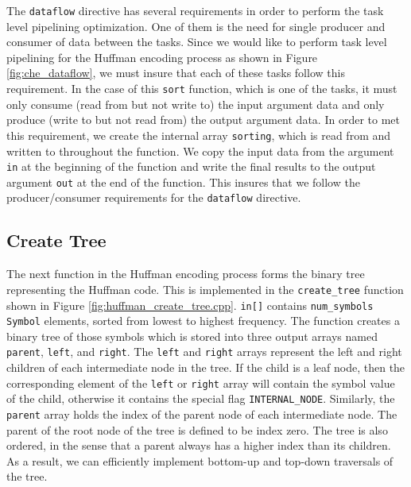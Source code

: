 \begin{aside}
The \lstinline{dataflow} directive has several requirements in order to perform the task level pipelining optimization. One of them is the need for single producer and consumer of data between the tasks. Since we would like to perform task level pipelining for the Huffman encoding process as shown in Figure \ref{fig:che_dataflow}, we must insure that each of these tasks follow this requirement. In the case of this \lstinline{sort} function, which is one of the tasks, it must only consume (read from but not write to) the input argument data and only produce (write to but not read from) the output argument data. In order to met this requirement, we create the internal array \lstinline{sorting}, which is read from and written to throughout the function. We copy the input data from the argument \lstinline{in} at the beginning of the function and write the final results to the output argument \lstinline{out} at the end of the function. This insures that we follow the producer/consumer requirements for the \lstinline{dataflow} directive.
\end{aside}

\subsection{Create Tree}
The next function in the Huffman encoding process forms the binary tree representing the Huffman code. This is implemented in the \lstinline{create_tree} function shown in Figure \ref{fig:huffman_create_tree.cpp}. \lstinline{in[]} contains \lstinline{num_symbols} \lstinline{Symbol} elements, sorted from lowest to highest frequency. The function creates a binary tree of those symbols which is stored into three output arrays named \lstinline{parent}, \lstinline{left}, and \lstinline{right}.  The \lstinline{left} and \lstinline{right} arrays represent the left and right children of each intermediate node in the tree.  If the child is a leaf node, then the corresponding element of the \lstinline{left} or \lstinline{right} array will contain the symbol value of the child, otherwise it contains the special flag \lstinline{INTERNAL_NODE}.   Similarly, the \lstinline{parent} array holds the index of the parent node of each intermediate node.  The parent of the root node of the tree is defined to be index zero.  The tree is also ordered, in the sense that a parent  always has a higher index than its children.  As a result, we can efficiently implement bottom-up and top-down traversals of the tree. 

